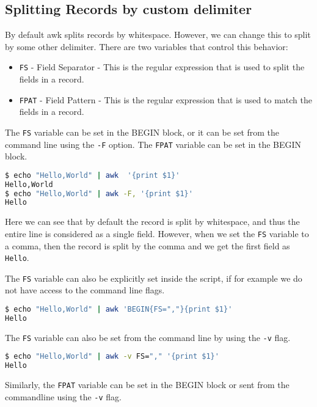 \subsection{Splitting Records by custom delimiter}

By default awk splits records by whitespace. However, we can change this to split by some other delimiter.
There are two variables that control this behavior:

\begin{itemize}
  \item \lstinline|FS| - Field Separator - This is the regular expression that is used to split the fields in a record.
  \item \lstinline|FPAT| - Field Pattern - This is the regular expression that is used to match the fields in a record.
\end{itemize}

The \lstinline|FS| variable can be set in the BEGIN block, or it can be set from the command line using the \lstinline|-F| option.
The \lstinline|FPAT| variable can be set in the BEGIN block.

\begin{lstlisting}[language=bash]
$ echo "Hello,World" | awk  '{print $1}'
Hello,World
$ echo "Hello,World" | awk -F, '{print $1}'
Hello
\end{lstlisting}

Here we can see that by default the record is split by whitespace, and thus the entire line is considered as a single field. However, when we set the \lstinline|FS| variable to a comma, then the record is split by the comma and we get the first field as \lstinline|Hello|.

The \lstinline|FS| variable can also be explicitly set inside the script, if for example we do not have access to the command line flags.

\begin{lstlisting}[language=bash]
$ echo "Hello,World" | awk 'BEGIN{FS=","}{print $1}'
Hello
\end{lstlisting}

The \lstinline|FS| variable can also be set from the command line by using the \lstinline|-v| flag.

\begin{lstlisting}[language=bash]
$ echo "Hello,World" | awk -v FS="," '{print $1}'
Hello
\end{lstlisting}

Similarly, the \lstinline|FPAT| variable can be set in the BEGIN block or sent from the commandline using the \lstinline|-v| flag.

